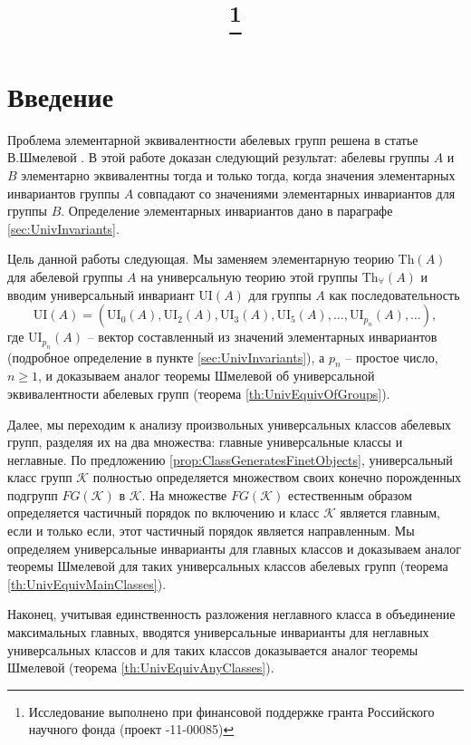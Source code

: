\documentclass[a4paper,11pt,twoside]{article}
\title{\titles\footnote{Исследование выполнено при финансовой поддержке гранта Российского научного фонда (проект \textnumero14-11-00085)}}
\author{\authors}
\gdef\firstpage{1}
\def\K{{\mathcal{K}}}
\def\Th{{\mathrm{Th}}}
\def\Tha{{\mathrm{Th}_\forall}}
\def\ui{{\mathrm{UI}}}
\begin{document}
\maketitle

\tableofcontents


\setcounter{page}{\firstpage}
\pagestyle{newpstyle}

\Russian
\sloppy
\rm


\section{Введение}

Проблема элементарной эквивалентности абелевых групп решена в статье В.Шмелевой \cite{Szm}. В этой работе доказан следующий результат: абелевы группы $A$ и $B$ элементарно эквивалентны тогда и только тогда, когда значения элементарных инвариантов группы $A$ совпадают со значениями элементарных инвариантов для группы $B$. Определение элементарных инвариантов дано в параграфе \ref{sec:UnivInvariants}.

Цель данной работы следующая. Мы заменяем элементарную теорию $\Th(A)$ для абелевой группы $A$ на универсальную теорию этой группы $\Tha(A)$ и вводим универсальный инвариант $\ui(A)$ для группы $A$ как последовательность 
$$\ui(A) = (\ui_0(A), \ui_2(A), \ui_3(A), \ui_5(A), \ldots, \ui_{p_n}(A), \ldots ),$$
где $\ui_{p_n}(A)$ -- вектор составленный из значений элементарных инвариантов (подробное определение в пункте \ref{sec:UnivInvariants}), а $p_n$ -- простое число, $n \geq 1$, и доказываем аналог теоремы Шмелевой об универсальной эквивалентности абелевых групп (теорема \ref{th:UnivEquivOfGroups}).

Далее, мы переходим к анализу произвольных универсальных классов абелевых групп, разделяя их на два множества: главные универсальные классы и неглавные. По предложению \ref{prop:ClassGeneratesFinetObjects}, универсальный класс групп $\K$ полностью определяется множеством своих конечно порожденных подгрупп $FG(\K)$ в $\K$. На множестве $FG(\K)$ естественным образом определяется частичный порядок по включению и класс $\K$ является главным, если и только если, этот частичный порядок является направленным. Мы определяем универсальные инварианты для главных классов и доказываем аналог теоремы Шмелевой для таких универсальных классов абелевых групп (теорема \ref{th:UnivEquivMainClasses}).

Наконец, учитывая единственность разложения неглавного класса в объединение максимальных главных, вводятся универсальные инварианты для неглавных универсальных классов и для таких классов доказывается аналог теоремы Шмелевой (теорема \ref{th:UnivEquivAnyClasses}).
\end{document}
